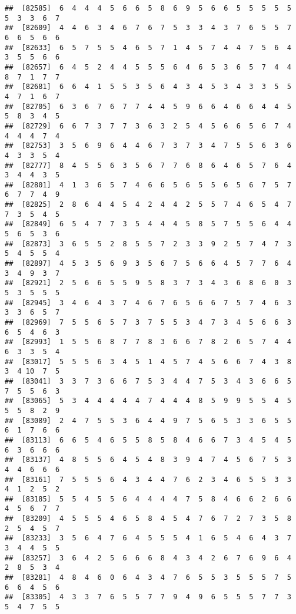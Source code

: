 \documentclass[
]{book}
\begin{document}
\begin{verbatim}
##  [82585]  6  4  4  4  5  6  6  5  8  6  9  5  6  6  5  5  5  5  5  5  3  3  6  7
##  [82609]  4  4  6  3  4  6  7  6  7  5  3  3  4  3  7  6  5  5  7  6  6  5  6  6
##  [82633]  6  5  7  5  5  4  6  5  7  1  4  5  7  4  4  7  5  6  4  3  5  5  6  6
##  [82657]  6  4  5  2  4  4  5  5  5  6  4  6  5  3  6  5  7  4  4  8  7  1  7  7
##  [82681]  6  6  4  1  5  5  3  5  6  4  3  4  5  3  4  3  3  5  5  4  7  1  6  7
##  [82705]  6  3  6  7  6  7  7  4  4  5  9  6  6  4  6  6  4  4  5  5  8  3  4  5
##  [82729]  6  6  7  3  7  7  3  6  3  2  5  4  5  6  6  5  6  7  4  4  4  4  7  4
##  [82753]  3  5  6  9  6  4  4  6  7  3  7  3  4  7  5  5  6  3  6  4  3  3  5  4
##  [82777]  8  4  5  5  6  3  5  6  7  7  6  8  6  4  6  5  7  6  4  3  4  4  3  5
##  [82801]  4  1  3  6  5  7  4  6  6  5  6  5  5  6  5  6  7  5  7  6  7  7  4  9
##  [82825]  2  8  6  4  4  5  4  2  4  4  2  5  5  7  4  6  5  4  7  7  3  5  4  5
##  [82849]  6  5  4  7  7  3  5  4  4  4  5  8  5  7  5  5  6  4  4  5  6  5  3  6
##  [82873]  3  6  5  5  2  8  5  5  7  2  3  3  9  2  5  7  4  7  3  5  4  5  5  4
##  [82897]  4  5  3  5  6  9  3  5  6  7  5  6  6  4  5  7  7  6  4  3  4  9  3  7
##  [82921]  2  5  6  6  5  5  9  5  8  3  7  3  4  3  6  8  6  0  3  5  3  5  5  5
##  [82945]  3  4  6  4  3  7  4  6  7  6  5  6  6  7  5  7  4  6  3  3  3  6  5  7
##  [82969]  7  5  5  6  5  7  3  7  5  5  3  4  7  3  4  5  6  6  3  6  5  4  6  3
##  [82993]  1  5  5  6  8  7  7  8  3  6  6  7  8  2  6  5  7  4  4  6  3  3  5  4
##  [83017]  5  5  5  6  3  4  5  1  4  5  7  4  5  6  6  7  4  3  8  3  4 10  7  5
##  [83041]  3  3  7  3  6  6  7  5  3  4  4  7  5  3  4  3  6  6  5  7  5  5  6  3
##  [83065]  5  3  4  4  4  4  4  7  4  4  4  8  5  9  9  5  5  4  5  5  5  8  2  9
##  [83089]  2  4  7  5  5  3  6  4  4  9  7  5  6  5  3  3  6  5  5  6  1  7  6  6
##  [83113]  6  6  5  4  6  5  5  8  5  8  4  6  6  7  3  4  5  4  5  6  3  6  6  6
##  [83137]  4  8  5  5  6  4  5  4  8  3  9  4  7  4  5  6  7  5  3  4  4  6  6  6
##  [83161]  7  5  5  5  6  4  3  4  4  7  6  2  3  4  6  5  5  3  3  4  1  2  5  2
##  [83185]  5  5  4  5  5  6  4  4  4  4  7  5  8  4  6  6  2  6  6  4  5  6  7  7
##  [83209]  4  5  5  5  4  6  5  8  4  5  4  7  6  7  2  7  3  5  8  2  5  4  5  7
##  [83233]  3  5  6  4  7  6  4  5  5  5  4  1  6  5  4  6  4  3  7  3  4  4  5  5
##  [83257]  3  6  4  2  5  6  6  6  8  4  3  4  2  6  7  6  9  6  4  2  8  5  3  4
##  [83281]  4  8  4  6  0  6  4  3  4  7  6  5  5  3  5  5  5  7  5  6  6  4  5  6
##  [83305]  4  3  3  7  6  5  5  7  7  9  4  9  6  5  5  5  7  7  3  5  4  7  5  5

\end{verbatim}
\end{document}

